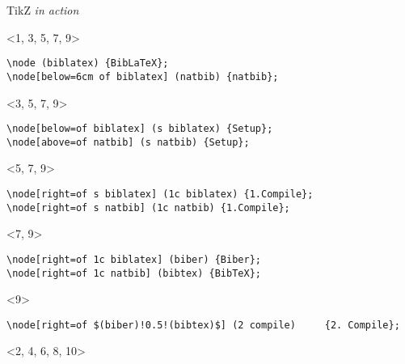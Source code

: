 \documentclass[main.tex]{subfiles}
\begin{document}
\begin{frame}[fragile]{TikZ \textit{in action}}
    \begin{onlyenv}%
        <1, 3, 5, 7, 9>
        \begin{verbatim}
\node (biblatex) {BibLaTeX};
\node[below=6cm of biblatex] (natbib) {natbib};
        \end{verbatim}
    \end{onlyenv}

    \begin{onlyenv}%
        <3, 5, 7, 9>
        \begin{verbatim}
\node[below=of biblatex] (s biblatex) {Setup};
\node[above=of natbib] (s natbib) {Setup};
        \end{verbatim}
    \end{onlyenv}

    \begin{onlyenv}%
        <5, 7, 9>
        \begin{verbatim}
\node[right=of s biblatex] (1c biblatex) {1.Compile};
\node[right=of s natbib] (1c natbib) {1.Compile};
        \end{verbatim}
    \end{onlyenv}

    \begin{onlyenv}%
        <7, 9>
        \begin{verbatim}
\node[right=of 1c biblatex] (biber) {Biber};
\node[right=of 1c natbib] (bibtex) {BibTeX};
        \end{verbatim}
    \end{onlyenv}

    \begin{onlyenv}%
    <9>
        \begin{verbatim}
\node[right=of $(biber)!0.5!(bibtex)$] (2 compile)     {2. Compile};
        \end{verbatim}
    \end{onlyenv}

    \begin{onlyenv}%
        <2, 4, 6, 8, 10>
        \begin{center}
            \advance\leftskip-25pt
            \vspace{-18pt}
            \def\colorSetup{ForestGreen}
            \def\colorCompile{VioletRed}
            \def\colorBackend{DeepSkyBlue}

            \begin{tikzpicture}
                [
                block/.style={rectangle, draw, minimum height=1cm, minimum width=2cm, align=center, thick},
                init/.style={initial by arrow, initial text=},
                arrow/.style={->,>=stealth},
                every initial by arrow/.style=arrow,
                every accepting by arrow/.style=arrow,
                ]


\end{tikzpicture}
\end{center}
\end{onlyenv}
\end{frame}
\end{document}
